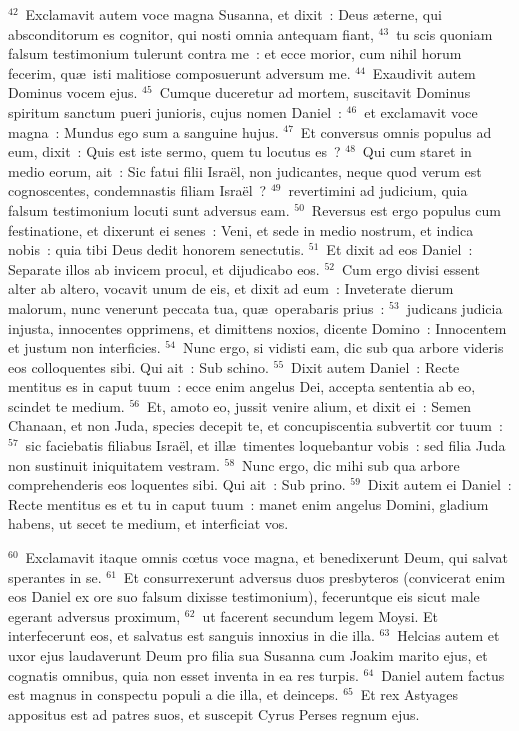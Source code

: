 ${}^{42}$~Exclamavit autem voce magna Susanna, et dixit~: Deus \ae terne, qui absconditorum es cognitor, qui nosti omnia antequam fiant,
${}^{43}$~tu scis quoniam falsum testimonium tulerunt contra me~: et ecce morior, cum nihil horum fecerim, qu\ae\ isti malitiose composuerunt adversum me.
${}^{44}$~Exaudivit autem Dominus vocem ejus.
${}^{45}$~Cumque duceretur ad mortem, suscitavit Dominus spiritum sanctum pueri junioris, cujus nomen Daniel~:
${}^{46}$~et exclamavit voce magna~: Mundus ego sum a sanguine hujus.
${}^{47}$~Et conversus omnis populus ad eum, dixit~: Quis est iste sermo, quem tu locutus es~?
${}^{48}$~Qui cum staret in medio eorum, ait~: Sic fatui filii Isra\"el, non judicantes, neque quod verum est cognoscentes, condemnastis filiam Isra\"el~?
${}^{49}$~revertimini ad judicium, quia falsum testimonium locuti sunt adversus eam.
${}^{50}$~Reversus est ergo populus cum festinatione, et dixerunt ei senes~: Veni, et sede in medio nostrum, et indica nobis~: quia tibi Deus dedit honorem senectutis.
${}^{51}$~Et dixit ad eos Daniel~: Separate illos ab invicem procul, et dijudicabo eos.
${}^{52}$~Cum ergo divisi essent alter ab altero, vocavit unum de eis, et dixit ad eum~: Inveterate dierum malorum, nunc venerunt peccata tua, qu\ae\ operabaris prius~:
${}^{53}$~judicans judicia injusta, innocentes opprimens, et dimittens noxios, dicente Domino~: Innocentem et justum non interficies.
${}^{54}$~Nunc ergo, si vidisti eam, dic sub qua arbore videris eos colloquentes sibi. Qui ait~: Sub schino.
${}^{55}$~Dixit autem Daniel~: Recte mentitus es in caput tuum~: ecce enim angelus Dei, accepta sententia ab eo, scindet te medium.
${}^{56}$~Et, amoto eo, jussit venire alium, et dixit ei~: Semen Chanaan, et non Juda, species decepit te, et concupiscentia subvertit cor tuum~:
${}^{57}$~sic faciebatis filiabus Isra\"el, et ill\ae\ timentes loquebantur vobis~: sed filia Juda non sustinuit iniquitatem vestram.
${}^{58}$~Nunc ergo, dic mihi sub qua arbore comprehenderis eos loquentes sibi. Qui ait~: Sub prino.
${}^{59}$~Dixit autem ei Daniel~: Recte mentitus es et tu in caput tuum~: manet enim angelus Domini, gladium habens, ut secet te medium, et interficiat vos.


${}^{60}$~Exclamavit itaque omnis cœtus voce magna, et benedixerunt Deum, qui salvat sperantes in se.
${}^{61}$~Et consurrexerunt adversus duos presbyteros (convicerat enim eos Daniel ex ore suo falsum dixisse testimonium), feceruntque eis sicut male egerant adversus proximum,
${}^{62}$~ut facerent secundum legem Moysi. Et interfecerunt eos, et salvatus est sanguis innoxius in die illa.
${}^{63}$~Helcias autem et uxor ejus laudaverunt Deum pro filia sua Susanna cum Joakim marito ejus, et cognatis omnibus, quia non esset inventa in ea res turpis.
${}^{64}$~Daniel autem factus est magnus in conspectu populi a die illa, et deinceps.
${}^{65}$~Et rex Astyages appositus est ad patres suos, et suscepit Cyrus Perses regnum ejus.

